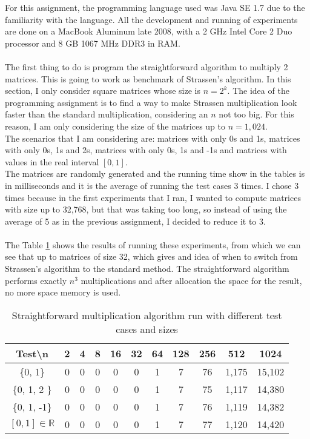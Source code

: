 \documentclass[tikz, 12pt]{scrartcl}
\begin{document}
For this assignment, the programming language used was Java SE 1.7 due to the familiarity with the language. All the development and running of experiments are done on a MacBook Aluminum late 2008, with a 2 GHz Intel Core 2 Duo processor and 8 GB 1067 MHz DDR3 in RAM. \\
\\
The first thing to do is program the straightforward algorithm to multiply 2 matrices. This is going to work as benchmark of Strassen's algorithm. In this section, I only consider square matrices whose size is $n = 2^k$. The idea of the programming assignment is to find a way to make Strassen multiplication look faster than the standard multiplication, considering an $n$ not too big. For this reason, I am only considering the size of the matrices up to $n = 1,024$. \\
The scenarios that I am considering are: matrices with only 0s and 1s, matrices with only 0s, 1s and 2s, matrices with only 0s, 1s and -1s and matrices with values in the real interval $[0, 1]$. \\
The matrices are randomly generated and the running time show in the tables is in milliseconds and it is the average of running the test cases 3 times. I chose 3 times because in the first experiments that I ran, I wanted to compute matrices with size up to 32,768, but that was taking too long, so instead of using the average of 5 as in the previous assignment, I decided to reduce it to 3. \\
\\
The Table \ref{straightforwardResults} shows the results of running these experiments, from which we can see that up to matrices of size 32, which gives and idea of when to switch from Strassen's algorithm to the standard method. The straightforward algorithm performs exactly $n^3$ multiplications and after allocation the space for the result, no more space memory is used.

\begin{table}[h!]
\caption{Straightforward multiplication algorithm run with different test cases and sizes\label{straightforwardResults}}
\centering
\begin{tabular}{|c|cccccccccc|}
\hline
Test\textbackslash  n		&	2	&	4	&	8	&	16	&	32	&	64	&	128	&	256	&	512	&	1024\\
\hline
\{0, 1\}				&	0	&	0	&	0	&	0	&	0	&	1	&	7	&	76	&	1,175	&	15,102\\
\{0, 1, 2 \}				&	0	&	0	&	0	&	0	&	0	&	1	&	7	&	75	&	1,117	&	14,380\\
\{0, 1, -1\}				&	0	&	0	&	0	&	0	&	0	&	1	&	7	&	76	&	1,119	&	14,382\\
$[0, 1] \in \mathbb{R}$	&	0	&	0	&	0	&	0	&	0	&	1	&	7	&	77	&	1,120	&	14,420\\
\hline
\end{tabular}
\end{table}
\end{document}
